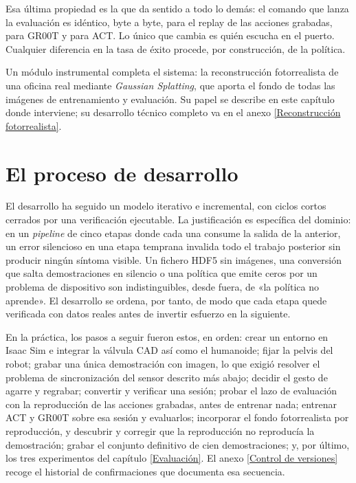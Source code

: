 Esa última propiedad es la que da sentido a todo lo demás: el comando que lanza la evaluación es
idéntico, byte a byte, para el replay de las acciones grabadas, para GR00T y para ACT. Lo único
que cambia es quién escucha en el puerto. Cualquier diferencia en la tasa de éxito procede, por
construcción, de la política.

Un módulo instrumental completa el sistema: la reconstrucción fotorrealista de una oficina real
mediante \textit{Gaussian Splatting}, que aporta el fondo de todas las imágenes de entrenamiento y
evaluación. Su papel se describe en este capítulo donde interviene; su desarrollo técnico completo
va en el anexo \ref{Reconstrucción fotorrealista}.


\section{El proceso de desarrollo}

El desarrollo ha seguido un modelo iterativo e incremental, con ciclos cortos cerrados por una
verificación ejecutable. La justificación es específica del dominio: en un \textit{pipeline} de cinco etapas
donde cada una consume la salida de la anterior, un error silencioso en una etapa temprana invalida
todo el trabajo posterior sin producir ningún síntoma visible. Un fichero HDF5 sin imágenes, una
conversión que salta demostraciones en silencio o una política que emite ceros por un problema de
dispositivo son indistinguibles, desde fuera, de «la política no aprende». El desarrollo se ordena,
por tanto, de modo que cada etapa quede verificada con datos reales antes de invertir esfuerzo en la
siguiente.

En la práctica, los pasos a seguir fueron estos, en orden: crear un entorno en Isaac Sim e integrar la válvula CAD así como el humanoide; fijar la pelvis del robot; grabar una única demostración con imagen, lo que exigió resolver el problema de sincronización del sensor descrito más abajo; decidir el gesto de agarre y regrabar; convertir y verificar una sesión; probar el lazo de evaluación con la reproducción de las acciones grabadas, antes de entrenar nada; entrenar ACT y GR00T sobre esa sesión y evaluarlos; incorporar el fondo fotorrealista por reproducción, y descubrir y corregir que la reproducción no reproducía la demostración; grabar el conjunto definitivo de cien demostraciones; y, por último, los tres experimentos del capítulo \ref{Evaluación}. El anexo \ref{Control de versiones} recoge el historial de confirmaciones que documenta esa secuencia.


